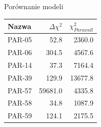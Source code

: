 \documentclass{beamer}
\begin{document}
\begin{frame}{Porównanie modeli}
    \begin{table}[h]
        \centering
        \begin{tabularx}{\linewidth}{X r r}
            \toprule
            Nazwa  & $\Delta\chi^2$ & $\chi^2 _{Paraxall}$ \\
            \midrule
            PAR-05 & 52.8           & 2360.0               \\
            PAR-06 & 304.5          & 4567.6               \\
            PAR-14 & 37.3           & 7164.4               \\
            PAR-39 & 129.9          & 13677.8              \\
            PAR-57 & 59681.0        & 4335.8               \\
            PAR-58 & 34.8           & 1087.9               \\
            PAR-59 & 124.1          & 2175.5               \\
            \bottomrule
        \end{tabularx}
    \end{table}

\end{frame}
\end{document}
